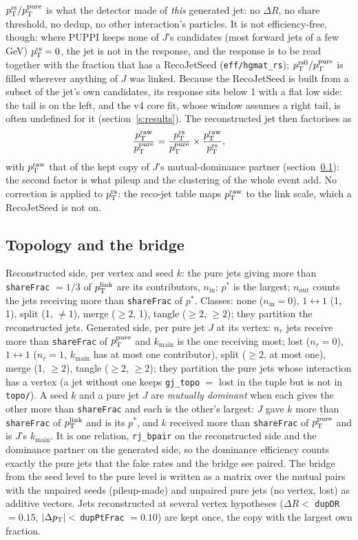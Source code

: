 $p_{\mathrm{T}}^{\mathrm{rs}}/p_{\mathrm{T}}^{\mathrm{pure}}$ is what the detector made of \emph{this} generated jet: no
$\Delta R$, no share threshold, no dedup, no other interaction's particles. It
is not efficiency-free, though: where PUPPI keeps none of $J$'s candidates
(most forward jets of a few GeV) $p_{\mathrm{T}}^{\mathrm{rs}} = 0$, the jet is not in the response,
and the response is to be read together with the fraction that has a
RecoJetSeed (\texttt{eff/hgmat\_rs}); $p_{\mathrm{T}}^{\mathrm{rs0}}/p_{\mathrm{T}}^{\mathrm{pure}}$ is filled
wherever anything of $J$ was linked. Because the RecoJetSeed is built from a
subset of the jet's own candidates, its response sits below 1 with a flat low
side: the tail is on the left, and the v4 core fit, whose window assumes a
right tail, is often undefined for it (section~\ref{s:results}). The
reconstructed jet then factorises as
\[
  \frac{p_{\mathrm{T}}^{\mathrm{raw}}}{p_{\mathrm{T}}^{\mathrm{pure}}} = \frac{p_{\mathrm{T}}^{\mathrm{rs}}}{p_{\mathrm{T}}^{\mathrm{pure}}} \times \frac{p_{\mathrm{T}}^{\mathrm{raw}}}{p_{\mathrm{T}}^{\mathrm{rs}}} ,
\]
with $p_{\mathrm{T}}^{\mathrm{raw}}$ that of the kept copy of $J$'s mutual-dominance partner
(section~\ref{s:topology}): the second factor is what pileup and the clustering
of the whole event add. No correction is applied to $p_{\mathrm{T}}^{\mathrm{rs}}$: the reco-jet
table maps $p_{\mathrm{T}}^{\mathrm{raw}}$ to the link scale, which a RecoJetSeed is not on.

\subsection{Topology and the bridge}
\label{s:topology}
Reconstructed side, per vertex and seed $k$: the pure jets giving more than
\texttt{shareFrac} $= 1/3$ of $p_{\mathrm{T}}^{\mathrm{link}}$ are its contributors, $n_{\mathrm{in}}$;
$p^*$ is the largest; $n_{\mathrm{out}}$ counts the jets receiving more than
\texttt{shareFrac} of $p^*$. Classes: none ($n_{\mathrm{in}} = 0$),
$1\leftrightarrow1$ (1, 1), split (1, $\ne 1$), merge ($\ge2$, 1), tangle
($\ge2$, $\ge2$); they partition the reconstructed jets. Generated side, per
pure jet $J$ at its vertex: $n_r$ jets receive more than \texttt{shareFrac} of
$p_{\mathrm{T}}^{\mathrm{pure}}$ and $k_{\mathrm{main}}$ is the one receiving most; lost ($n_r = 0$),
$1\leftrightarrow1$ ($n_r = 1$, $k_{\mathrm{main}}$ has at most one
contributor), split ($\ge2$, at most one), merge (1, $\ge2$), tangle ($\ge2$,
$\ge2$); they partition the pure jets whose interaction has a vertex (a jet
without one keeps \texttt{gj\_topo} $=$ lost in the tuple but is not in
\texttt{topo/}). A seed $k$ and a pure jet $J$ are \emph{mutually dominant}
when each gives the other more than \texttt{shareFrac} and each is the
other's largest: $J$ gave $k$ more than \texttt{shareFrac} of $p_{\mathrm{T}}^{\mathrm{link}}$ and is
its $p^*$, and $k$ received more than \texttt{shareFrac} of $p_{\mathrm{T}}^{\mathrm{pure}}$ and is
$J$'s $k_{\mathrm{main}}$. It is one relation, \texttt{rj\_bpair} on the
reconstructed side and the dominance partner on the generated side, so the
dominance efficiency counts exactly the pure jets that the fake rates and the
bridge see paired. The bridge from the seed level to the pure level is written
as a matrix over the mutual pairs with the unpaired seeds (pileup-made) and
unpaired pure jets (no vertex, lost) as additive vectors. Jets reconstructed
at several vertex hypotheses ($\Delta R < $ \texttt{dupDR} $= 0.15$, $|\Delta p_{\mathrm{T}}| <$
\texttt{dupPtFrac} $= 0.10$) are kept once, the copy with the largest own
fraction.

